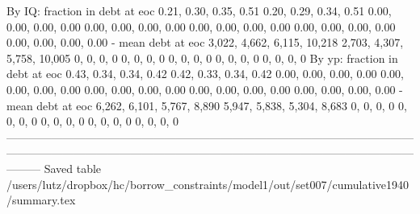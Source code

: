         By IQ: fraction in debt at eoc       0.21, 0.30, 0.35, 0.51       0.20, 0.29, 0.34, 0.51   0.00, 0.00, 0.00, 0.00    0.00, 0.00, 0.00, 0.00    0.00, 0.00, 0.00, 0.00    0.00, 0.00, 0.00, 0.00    0.00, 0.00, 0.00, 0.00
                    - mean debt at eoc  3,022, 4,662, 6,115, 10,218  2,703, 4,307, 5,758, 10,005               0, 0, 0, 0                0, 0, 0, 0                0, 0, 0, 0                0, 0, 0, 0                0, 0, 0, 0
        By yp: fraction in debt at eoc       0.43, 0.34, 0.34, 0.42       0.42, 0.33, 0.34, 0.42   0.00, 0.00, 0.00, 0.00    0.00, 0.00, 0.00, 0.00    0.00, 0.00, 0.00, 0.00    0.00, 0.00, 0.00, 0.00    0.00, 0.00, 0.00, 0.00
                    - mean debt at eoc   6,262, 6,101, 5,767, 8,890   5,947, 5,838, 5,304, 8,683               0, 0, 0, 0                0, 0, 0, 0                0, 0, 0, 0                0, 0, 0, 0                0, 0, 0, 0
---------------------------------------------------------------------------------------------------------------------------------------------------------------------------------------------------------------------------------
Saved table  /users/lutz/dropbox/hc/borrow_constraints/model1/out/set007/cumulative1940/summary.tex 
